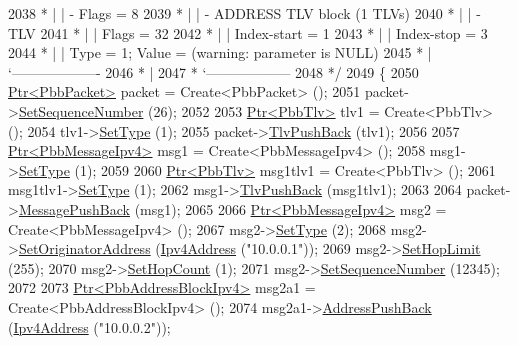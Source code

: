 \begin{DoxyCode}
2038 \textcolor{comment}{         * |    |     - Flags = 8}
2039 \textcolor{comment}{         * |    | - ADDRESS TLV block (1 TLVs)}
2040 \textcolor{comment}{         * |    |     - TLV}
2041 \textcolor{comment}{         * |    |         Flags = 32}
2042 \textcolor{comment}{         * |    |         Index-start = 1}
2043 \textcolor{comment}{         * |    |         Index-stop = 3}
2044 \textcolor{comment}{         * |    |         Type = 1; Value = (warning: parameter is NULL)}
2045 \textcolor{comment}{         * |    `-------------------}
2046 \textcolor{comment}{         * |}
2047 \textcolor{comment}{         * `------------------}
2048 \textcolor{comment}{   */}
2049   \{
2050     \hyperlink{classns3_1_1Ptr}{Ptr<PbbPacket>} packet = Create<PbbPacket> ();
2051     packet->\hyperlink{classns3_1_1PbbPacket_a7d6a1602be86109760d0f26ff9bbbb8e}{SetSequenceNumber} (26);
2052 
2053     \hyperlink{classns3_1_1Ptr}{Ptr<PbbTlv>} tlv1 = Create<PbbTlv> ();
2054     tlv1->\hyperlink{classns3_1_1PbbTlv_a90a0452018ed364ac37c3ad116dd718b}{SetType} (1);
2055     packet->\hyperlink{classns3_1_1PbbPacket_a34935793e729a106c176db99c969cb42}{TlvPushBack} (tlv1);
2056 
2057     \hyperlink{classns3_1_1Ptr}{Ptr<PbbMessageIpv4>} msg1 = Create<PbbMessageIpv4> ();
2058     msg1->\hyperlink{classns3_1_1PbbMessage_a4b3d1eaabd3e7412a46ac79bf3360dac}{SetType} (1);
2059 
2060     \hyperlink{classns3_1_1Ptr}{Ptr<PbbTlv>} msg1tlv1 = Create<PbbTlv> ();
2061     msg1tlv1->\hyperlink{classns3_1_1PbbTlv_a90a0452018ed364ac37c3ad116dd718b}{SetType} (1);
2062     msg1->\hyperlink{classns3_1_1PbbMessage_aac70b2672f79765cf5cc5b6666018165}{TlvPushBack} (msg1tlv1);
2063 
2064     packet->\hyperlink{classns3_1_1PbbPacket_a4a3170001ef758d9c9c4375b8f089826}{MessagePushBack} (msg1);
2065 
2066     \hyperlink{classns3_1_1Ptr}{Ptr<PbbMessageIpv4>} msg2 = Create<PbbMessageIpv4> ();
2067     msg2->\hyperlink{classns3_1_1PbbMessage_a4b3d1eaabd3e7412a46ac79bf3360dac}{SetType} (2);
2068     msg2->\hyperlink{classns3_1_1PbbMessage_a52ac135a2bec53db5e8f46b8b8a25e7c}{SetOriginatorAddress} (\hyperlink{classns3_1_1Ipv4Address}{Ipv4Address} (\textcolor{stringliteral}{"10.0.0.1"}));
2069     msg2->\hyperlink{classns3_1_1PbbMessage_a532a7e5e135f7491f8a84ab1dfadd28f}{SetHopLimit} (255);
2070     msg2->\hyperlink{classns3_1_1PbbMessage_a882ec7e2e9a9dff6297152c196d54ce4}{SetHopCount} (1);
2071     msg2->\hyperlink{classns3_1_1PbbMessage_a8c24696ac67507afa03c9750daccc47d}{SetSequenceNumber} (12345);
2072 
2073     \hyperlink{classns3_1_1Ptr}{Ptr<PbbAddressBlockIpv4>} msg2a1 = Create<PbbAddressBlockIpv4> ();
2074     msg2a1->\hyperlink{classns3_1_1PbbAddressBlock_a7be545a53d69bd426dbebcf752ed8371}{AddressPushBack} (\hyperlink{classns3_1_1Ipv4Address}{Ipv4Address} (\textcolor{stringliteral}{"10.0.0.2"}));

\end{DoxyCode}
